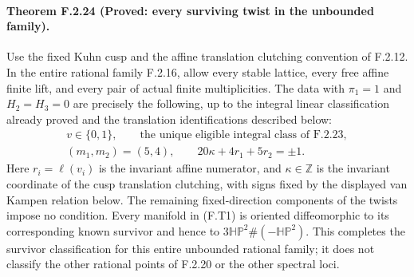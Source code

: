 \paragraph{Theorem F.2.24 (Proved: every surviving twist in the unbounded family).}
Use the fixed Kuhn cusp and the affine translation clutching
convention of F.2.12.  In the entire rational family F.2.16,
allow every stable lattice, every free affine finite lift,
and every pair of actual finite multiplicities.
The data with $\pi_1=1$ and $H_2=H_3=0$ are precisely the
following, up to the integral linear classification already
proved and the translation identifications described below:
\[
\begin{gathered}
 v\in\{0,1\},\qquad
 \text{the unique eligible integral class of F.2.23},\\
 (m_1,m_2)=(5,4),\qquad
 20\kappa+4r_1+5r_2=\pm1.
\end{gathered}
 \tag{F.T1}
\]
Here $r_i=\ell(v_i)$ is the invariant affine numerator, and
$\kappa\in\mathbb Z$ is the invariant coordinate of the
cusp translation clutching, with signs fixed by the displayed
van Kampen relation below.  The remaining fixed-direction
components of the twists impose no condition.
Every manifold in (F.T1) is oriented diffeomorphic to its
corresponding known survivor and hence to
$3\mathbb{HP}^2\#(-\mathbb{HP}^2)$.
This completes the survivor classification for this entire
unbounded rational family; it does not classify the other
rational points of F.2.20 or the other spectral loci.

